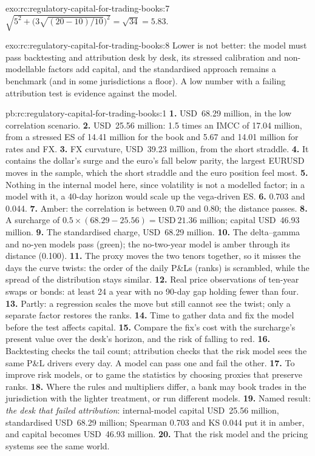 \begin{solution}{exo:rc:regulatory-capital-for-trading-books:7}
$\sqrt{5^2+\bigl(3\sqrt{(20-10)/10}\bigr)^2} = \sqrt{34} = 5.83$.
\end{solution}

\begin{solution}{exo:rc:regulatory-capital-for-trading-books:8}
Lower is not better: the model must pass backtesting and attribution desk by desk, its stressed
calibration and non-modellable factors add capital, and the standardised approach remains a
benchmark (and in some jurisdictions a floor). A low number with a failing attribution test is
evidence against the model.
\end{solution}

\begin{solution}{pb:rc:regulatory-capital-for-trading-books:1}
\textbf{1.} USD~68.29 million, in the low correlation scenario.
\textbf{2.} USD~25.56 million: 1.5 times an IMCC of 17.04 million, from a stressed ES of 14.41 million
for the book and 5.67 and 14.01 million for rates and FX.
\textbf{3.} FX curvature, USD~39.23 million, from the short straddle.
\textbf{4.} It contains the dollar's surge and the euro's fall below parity, the largest EURUSD moves in
the sample, which the short straddle and the euro position feel most.
\textbf{5.} Nothing in the internal model here, since volatility is not a modelled factor; in a model with
it, a 40-day horizon would scale up the vega-driven ES.
\textbf{6.} 0.703 and 0.044.
\textbf{7.} Amber: the correlation is between 0.70 and 0.80; the distance passes.
\textbf{8.} A surcharge of $0.5\times(68.29-25.56) = \text{USD}~21.36$ million; capital USD~46.93 million.
\textbf{9.} The standardised charge, USD~68.29 million.
\textbf{10.} The delta--gamma and no-yen models pass (green); the no-two-year model is amber through its
distance (0.100).
\textbf{11.} The proxy moves the two tenors together, so it misses the days the curve twists: the order of
the daily P\&Ls (ranks) is scrambled, while the spread of the distribution stays similar.
\textbf{12.} Real price observations of ten-year swaps or bonds: at least 24 a year with no 90-day gap
holding fewer than four.
\textbf{13.} Partly: a regression scales the move but still cannot see the twist; only a separate factor
restores the ranks.
\textbf{14.} Time to gather data and fix the model before the test affects capital.
\textbf{15.} Compare the fix's cost with the surcharge's present value over the desk's horizon, and the
risk of falling to red.
\textbf{16.} Backtesting checks the tail count; attribution checks that the risk model sees the same
P\&L drivers every day. A model can pass one and fail the other.
\textbf{17.} To improve risk models, or to game the statistics by choosing proxies that preserve ranks.
\textbf{18.} Where the rules and multipliers differ, a bank may book trades in the jurisdiction with the
lighter treatment, or run different models.
\textbf{19.} Named result: \emph{the desk that failed attribution}: internal-model capital USD~25.56 million,
standardised USD~68.29 million; Spearman 0.703 and KS 0.044 put it in amber, and capital becomes USD~46.93
million.
\textbf{20.} That the risk model and the pricing systems see the same world.
\end{solution}

